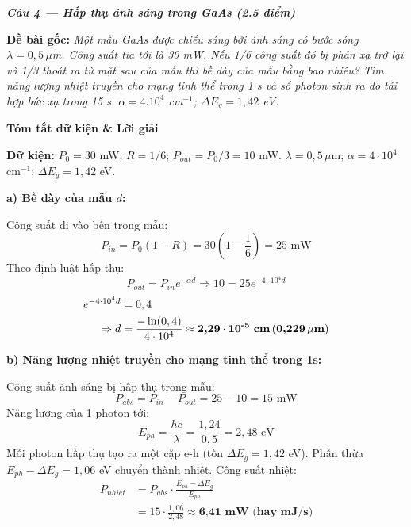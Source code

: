 \documentclass[11pt,a4paper,twocolumn]{article}
\begin{document}
\vspace{0.4cm}
\textbf{\textit{Câu 4 --- Hấp thụ ánh sáng trong GaAs (2.5 điểm)}}

\textbf{Đề bài gốc:} \textit{Một mẫu GaAs được chiếu sáng bởi ánh sáng có bước sóng $\lambda = 0,5 \, \mu$m. Công suất tia tới là 30 mW. Nếu 1/6 công suất đó bị phản xạ trở lại và 1/3 thoát ra từ mặt sau của mẫu thì bề dày của mẫu bằng bao nhiêu? Tìm năng lượng nhiệt truyền cho mạng tinh thể trong 1 s và số photon sinh ra do tái hợp bức xạ trong 15 s. $\alpha = 4.10^4$ cm$^{-1}$; $\Delta E_g = 1,42$ eV.}

\textbf{Tóm tắt dữ kiện \& Lời giải}

\textbf{Dữ kiện:} $P_0 = 30$ mW; $R = 1/6$; $P_{out} = P_0/3 = 10$ mW. $\lambda = 0,5 \, \mu$m; $\alpha = 4 \cdot 10^4$ cm$^{-1}$; $\Delta E_g = 1,42$ eV.

\textbf{a) Bề dày của mẫu $d$:}

Công suất đi vào bên trong mẫu:
\begin{equation*}
    P_{in} = P_0 \left( 1 - R \right) = 30 \left( 1 - \frac{1}{6} \right) = 25 \text{ mW}
\end{equation*}
Theo định luật hấp thụ:
\begin{equation*}
    \boxed{P_{out} = P_{in} e^{-\alpha d}} \Rightarrow 10 = 25 e^{-4 \cdot 10^4 d}
\end{equation*}
\begin{align*}
    e^{-4 \cdot 10^4 d} &= 0,4 \\
    \Rightarrow d &= \frac{-\ln(0,4)}{4 \cdot 10^4} \approx \textbf{2,29} \cdot \textbf{10}^{\textbf{-5}} \text{ \textbf{cm}} \, (\textbf{0,229} \, \mu\textbf{m})
\end{align*}

\textbf{b) Năng lượng nhiệt truyền cho mạng tinh thể trong 1s:}

Công suất ánh sáng bị hấp thụ trong mẫu:
\begin{equation*}
    P_{abs} = P_{in} - P_{out} = 25 - 10 = 15 \text{ mW}
\end{equation*}
Năng lượng của 1 photon tới:
\begin{equation*}
    E_{ph} = \frac{hc}{\lambda} = \frac{1,24}{0,5} = 2,48 \text{ eV}
\end{equation*}
Mỗi photon hấp thụ tạo ra một cặp e-h (tốn $\Delta E_g = 1,42$ eV). Phần thừa $E_{ph} - \Delta E_g = 1,06$ eV chuyển thành nhiệt.
Công suất nhiệt:
\begin{align*}
    P_{nhiet} &= P_{abs} \cdot \frac{E_{ph} - \Delta E_g}{E_{ph}} \\
    &= 15 \cdot \frac{1,06}{2,48} \approx \textbf{6,41 mW (hay mJ/s)}
\end{align*}
\end{document}
